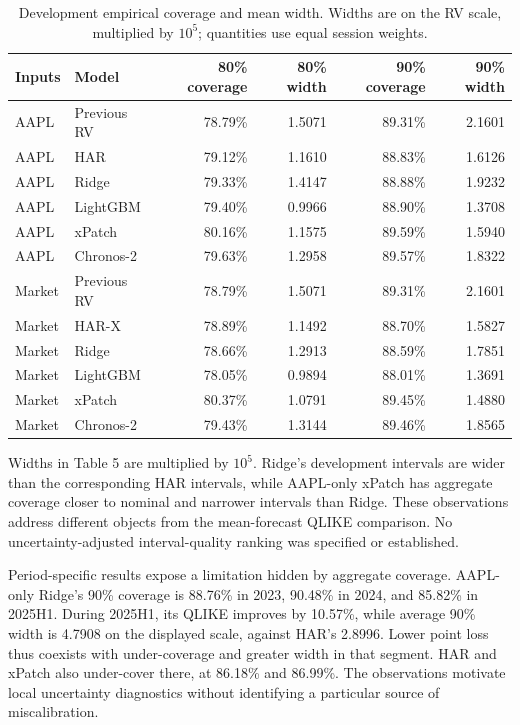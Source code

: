 \begin{table}[!t]
\centering
\footnotesize
\caption{Development empirical coverage and mean width. Widths are on the RV scale, multiplied by $10^5$; quantities use equal session weights.}
\label{tab:results-5}
\begin{tabular}{llrrrr}
\toprule
Inputs & Model & 80\% coverage & 80\% width & 90\% coverage & 90\% width \\
\midrule
AAPL & Previous RV & 78.79\% & 1.5071 & 89.31\% & 2.1601 \\
AAPL & HAR & 79.12\% & 1.1610 & 88.83\% & 1.6126 \\
AAPL & Ridge & 79.33\% & 1.4147 & 88.88\% & 1.9232 \\
AAPL & LightGBM & 79.40\% & 0.9966 & 88.90\% & 1.3708 \\
AAPL & xPatch & 80.16\% & 1.1575 & 89.59\% & 1.5940 \\
AAPL & Chronos-2 & 79.63\% & 1.2958 & 89.57\% & 1.8322 \\
Market & Previous RV & 78.79\% & 1.5071 & 89.31\% & 2.1601 \\
Market & HAR-X & 78.89\% & 1.1492 & 88.70\% & 1.5827 \\
Market & Ridge & 78.66\% & 1.2913 & 88.59\% & 1.7851 \\
Market & LightGBM & 78.05\% & 0.9894 & 88.01\% & 1.3691 \\
Market & xPatch & 80.37\% & 1.0791 & 89.45\% & 1.4880 \\
Market & Chronos-2 & 79.43\% & 1.3144 & 89.46\% & 1.8565 \\
\bottomrule
\end{tabular}
\end{table}

Widths in Table 5 are multiplied by \(10^5\). Ridge's development
intervals are wider than the corresponding HAR intervals, while
AAPL-only xPatch has aggregate coverage closer to nominal and narrower
intervals than Ridge. These observations address different objects from
the mean-forecast QLIKE comparison. No uncertainty-adjusted
interval-quality ranking was specified or established.

Period-specific results expose a limitation hidden by aggregate
coverage. AAPL-only Ridge's 90\% coverage is 88.76\% in 2023, 90.48\% in
2024, and 85.82\% in 2025H1. During 2025H1, its QLIKE improves by
10.57\%, while average 90\% width is 4.7908 on the displayed scale,
against HAR's 2.8996. Lower point loss thus coexists with under-coverage
and greater width in that segment. HAR and xPatch also under-cover
there, at 86.18\% and 86.99\%. The observations motivate local
uncertainty diagnostics without identifying a particular source of
miscalibration.

